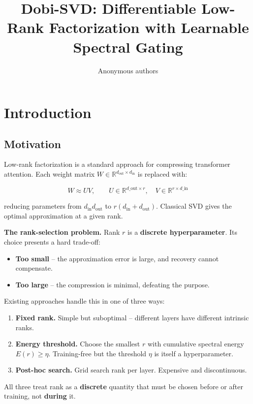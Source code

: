 \title{\textbf{Dobi-SVD: Differentiable Low-Rank Factorization with Learnable Spectral Gating}}

\author{Anonymous authors}



\section{Introduction}

\subsection{Motivation}

Low-rank factorization is a standard approach for compressing transformer 
attention. Each weight matrix $W \in \mathbb{R}^{d_\text{out} \times d_\text{in}}$ 
is replaced with:

\[
W \approx U V, \qquad
U \in \mathbb{R}^{d\_\text{out} \times r}, \quad
V \in \mathbb{R}^{r \times d\_\text{in}}
\tag{1.1}
\]

reducing parameters from $d_\text{in} d_\text{out}$ to $r(d_\text{in} + d_\text{out})$. 
Classical SVD gives the optimal approximation at a given rank.

\textbf{The rank-selection problem.} Rank $r$ is a \textbf{discrete hyperparameter}. 
Its choice presents a hard trade-off:

\begin{itemize}
\item \textbf{Too small} -- the approximation error is large, and recovery cannot
  compensate.
\item \textbf{Too large} -- the compression is minimal, defeating the purpose.

\end{itemize}
Existing approaches handle this in one of three ways:

\begin{enumerate}
\item \textbf{Fixed rank.} Simple but suboptimal -- different layers have different
  intrinsic ranks.
\item \textbf{Energy threshold.} Choose the smallest $r$ with cumulative spectral
  energy $E(r) \geq \eta$. Training-free but the threshold $\eta$ is
  itself a hyperparameter.
\item \textbf{Post-hoc search.} Grid search rank per layer. Expensive and
  discontinuous.

\end{enumerate}
All three treat rank as a \textbf{discrete} quantity that must be chosen before 
or after training, not \textbf{during} it.


